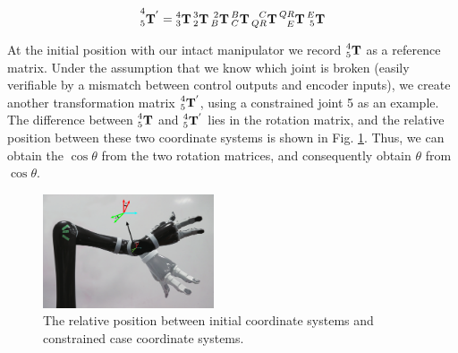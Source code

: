 \documentclass{ieeeaccess}
\begin{document}
\begin{equation}
\prescript{4}{5}{\mathbf{T^{'}}} = 	
\prescript{4}{3}{\mathbf{T}}
\prescript{3}{2}{\mathbf{T}}
\prescript{2}{B}{\mathbf{T}}
\prescript{B}{C}{\mathbf{T}}
\prescript{C}{QR}{\mathbf{T}}
\prescript{QR}{E}{\mathbf{T}}
\prescript{E}{5}{\mathbf{T}}
\label{chain:new}
\end{equation}




At the initial position with our intact manipulator we record $\prescript{4}{5}{\mathbf{T}}$ as a reference matrix. Under the assumption that we know which joint is broken (easily verifiable by a mismatch between control outputs and encoder inputs), we create another transformation matrix $\prescript{4}{5}{\mathbf{T}}^{'}$, using a constrained joint 5 as an example. The difference between $\prescript{4}{5}{\mathbf{T}}$ and $\prescript{4}{5}{\mathbf{T}}^{'}$ lies in the rotation matrix, and the relative position between these two coordinate systems is shown in Fig. \ref{f2}. 
Thus, we can obtain the $\cos\theta$ from the two rotation matrices, and consequently obtain $\theta$ from $\cos\theta$. 

\begin{figure}[t]
	\centering
	\includegraphics[width=0.45\textwidth,height=0.29\textwidth ]{img/f2.pdf}
	\caption{The relative position between  initial  coordinate systems and constrained case coordinate systems. }
	\label{f2}
\end{figure}
\end{document}
